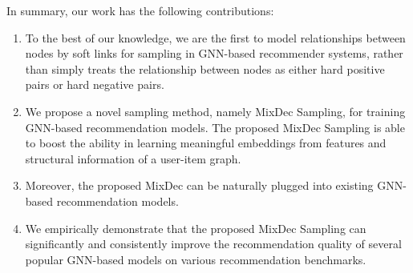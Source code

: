In summary, our work has the following contributions:
\begin{enumerate}
    \item To the best of our knowledge, we are the first to model relationships between nodes by soft links for sampling in GNN-based recommender systems, rather than 
    simply treats the relationship between nodes as either hard positive pairs or hard negative pairs. %
    \item We propose a novel sampling method, namely MixDec Sampling, for training GNN-based recommendation models. The proposed MixDec Sampling is able to boost the ability in learning meaningful embeddings from features and structural information of a user-item graph.
    \item Moreover, the proposed MixDec can be naturally plugged into existing GNN-based recommendation models.
    \item We empirically demonstrate that the proposed MixDec Sampling can significantly and consistently improve the recommendation quality of several popular GNN-based models on various recommendation benchmarks.
\end{enumerate}